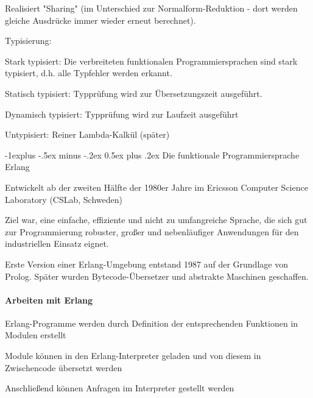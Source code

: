 \documentclass[10pt]{article}
\makeatletter
\renewcommand{\subsection}{\@startsection{subsection}{2}{0mm}%
                                {-1explus -.5ex minus -.2ex}%
                                {0.5ex plus .2ex}%
                                {\normalfont\normalsize\bfseries}}
\makeatother
\begin{document}
\begin{itemize*}
\begin{itemize*}
\begin{itemize*}
      \item Realisiert "Sharing" (im Unterschied zur Normalform-Reduktion - dort werden gleiche Ausdrücke immer wieder erneut berechnet).
    \end{itemize*}
  \end{itemize*}
  \item Typisierung:
  \begin{itemize*}
    \item Stark typisiert: Die verbreiteten funktionalen Programmiersprachen sind stark typisiert, d.h. alle Typfehler werden erkannt.
    \begin{itemize*}
      \item Statisch typisiert: Typprüfung wird zur Übersetzungszeit ausgeführt.
      \item Dynamisch typisiert: Typprüfung wird zur Laufzeit ausgeführt
    \end{itemize*}
    \item Untypisiert: Reiner Lambda-Kalkül (später)
  \end{itemize*}
\end{itemize*}

\subsection{Die funktionale Programmiersprache Erlang}
\begin{itemize*}
  \item Entwickelt ab der zweiten Hälfte der 1980er Jahre im Ericsson Computer Science Laboratory (CSLab, Schweden)
  \item Ziel war, eine einfache, effiziente und nicht zu umfangreiche Sprache, die sich gut zur Programmierung robuster, großer und nebenläufiger Anwendungen für den industriellen Einsatz eignet.
  \item Erste Version einer Erlang-Umgebung entstand 1987 auf der Grundlage von Prolog. Später wurden Bytecode-Übersetzer und abstrakte Maschinen geschaffen.
\end{itemize*}

\paragraph{Arbeiten mit Erlang}
\begin{itemize*}
  \item Erlang-Programme werden durch Definition der entsprechenden Funktionen in Modulen erstellt
  \item Module können in den Erlang-Interpreter geladen und von diesem in Zwischencode übersetzt werden
  \item Anschließend können Anfragen im Interpreter gestellt werden
\end{itemize*}
\end{document}
